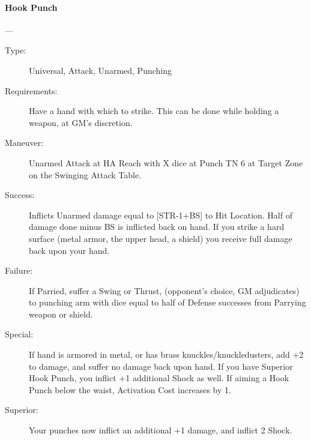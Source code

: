\documentclass[oneside,11pt,english]{book}
\begin{document}
\paragraph{\large\label{man:Hook Punch}Hook Punch}---\quad{\large[X]}
\vspace{-10pt}\begin{description} 
\item [Type:] Universal, Attack, Unarmed, Punching 
\item [Requirements:] Have a hand with which to strike. This can be done while holding a weapon, at GM's 
discretion. 
\item [Maneuver:] Unarmed Attack at HA Reach with X dice at Punch TN 6 at Target Zone on the Swinging 
Attack Table. 
\item [Success:] Inflicts Unarmed damage equal to [STR-1+BS] to Hit Location. Half of damage done minus BS 
is inflicted back on hand. If you strike a hard surface (metal armor, the upper head, a shield) you receive 
full damage back upon your hand. 
\item [Failure:] If Parried, suffer a Swing or Thrust, (opponent’s choice, GM adjudicates) to punching arm with 
dice equal to half of Defense successes from Parrying weapon or shield. 
\item [Special:] If hand is armored in metal, or has brass knuckles/knuckledusters, add +2 to damage, and suffer 
no damage back upon hand. If you have Superior Hook Punch, you inflict +1 additional Shock as well. 
If aiming a Hook Punch below the waist, Activation Cost increases by 1. 
\item [Superior:] Your punches now inflict an additional +1 damage, and inflict 2 Shock. 
\end{description}
\end{document}
